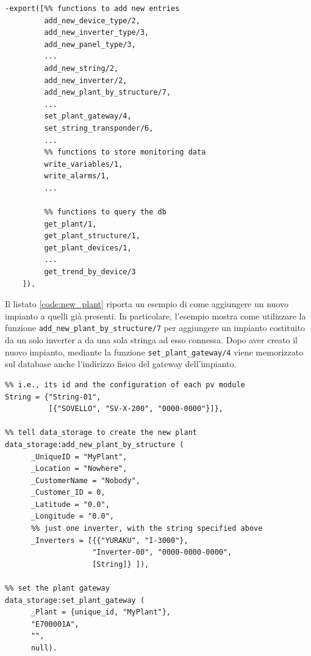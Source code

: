 %
\begin{lstlisting}[caption={Interfaccia del modulo \texttt{data\_storage}}, label={code:data_storage_interface},frame=trBL]
-export([%% functions to add new entries
         add_new_device_type/2,
         add_new_inverter_type/3,
         add_new_panel_type/3,
         ...
         add_new_string/2,
         add_new_inverter/2,
         add_new_plant_by_structure/7,
         ...
         set_plant_gateway/4,
         set_string_transponder/6,
         ...    
         %% functions to store monitoring data
         write_variables/1,
         write_alarms/1,
         ...

         %% functions to query the db
         get_plant/1,
         get_plant_structure/1,
         get_plant_devices/1,
         ...
         get_trend_by_device/3
	]).
\end{lstlisting}
%
Il listato \ref{code:new_plant} riporta un esempio di come aggiungere un nuovo impianto
a quelli gi\`a presenti. In particolare, l'esempio mostra come utilizzare la funzione 
\texttt{add\_new\_plant\_by\_structure/7} per aggiungere un impianto costituito da un 
solo inverter a da una sola stringa ad esso connessa.
%
Dopo aver creato il nuovo impianto, mediante la funzione \texttt{set\_plant\_gateway/4}
viene memorizzato sul database anche l'indirizzo fisico del gateway dell'impianto.
%

%
\begin{lstlisting}[caption={Inserimento di un nuovo impianto}, label={code:new_plant},frame=trBL]
%% specify the string configuration
%% i.e., its id and the configuration of each pv module
String = {"String-01", 
          [{"SOVELLO", "SV-X-200", "0000-0000"}]},

%% tell data_storage to create the new plant
data_storage:add_new_plant_by_structure (
      _UniqueID = "MyPlant", 
      _Location = "Nowhere",
      _CustomerName = "Nobody", 
      _Customer_ID = 0,
      _Latitude = "0.0", 
      _Longitude = "0.0",
      %% just one inverter, with the string specified above
      _Inverters = [{{"YURAKU", "I-3000"}, 
                    "Inverter-00", "0000-0000-0000", 
                    [String]} ]),
    
%% set the plant gateway
data_storage:set_plant_gateway (
      _Plant = {unique_id, "MyPlant"}, 
      "E700001A", 
      "", 
      null).
\end{lstlisting}
%

%
